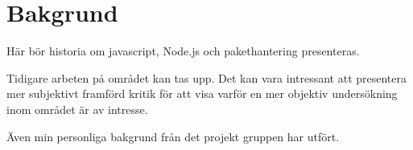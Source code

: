 \section{Bakgrund}
\label{sec:joel_o-background}
Här bör historia om javascript, Node.js och pakethantering presenteras.

Tidigare arbeten på området kan tas upp. Det kan vara intressant att presentera mer subjektivt framförd kritik för att visa varför en mer objektiv undersökning inom området är av intresse.

Även min personliga bakgrund från det projekt gruppen har utfört.
